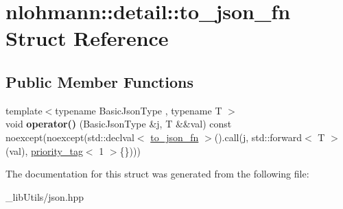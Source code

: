 \hypertarget{structnlohmann_1_1detail_1_1to__json__fn}{}\section{nlohmann\+:\+:detail\+:\+:to\+\_\+json\+\_\+fn Struct Reference}
\label{structnlohmann_1_1detail_1_1to__json__fn}
\subsection*{Public Member Functions}
\begin{DoxyCompactItemize}
\item 
{\footnotesize template$<$typename Basic\+Json\+Type , typename T $>$ }\\void {\bfseries operator()} (Basic\+Json\+Type \&j, T \&\&val) const noexcept(noexcept(std\+::declval$<$ \hyperlink{structnlohmann_1_1detail_1_1to__json__fn}{to\+\_\+json\+\_\+fn} $>$().call(j, std\+::forward$<$ T $>$(val), \hyperlink{structnlohmann_1_1detail_1_1priority__tag}{priority\+\_\+tag}$<$ 1 $>$\{\})))\hypertarget{structnlohmann_1_1detail_1_1to__json__fn_a29dfa4bfda3ac49ea22a76aaf2af6e0c}{}\label{structnlohmann_1_1detail_1_1to__json__fn_a29dfa4bfda3ac49ea22a76aaf2af6e0c}

\end{DoxyCompactItemize}


The documentation for this struct was generated from the following file\+:\begin{DoxyCompactItemize}
\item 
\+\_\+lib\+Utils/json.\+hpp\end{DoxyCompactItemize}
